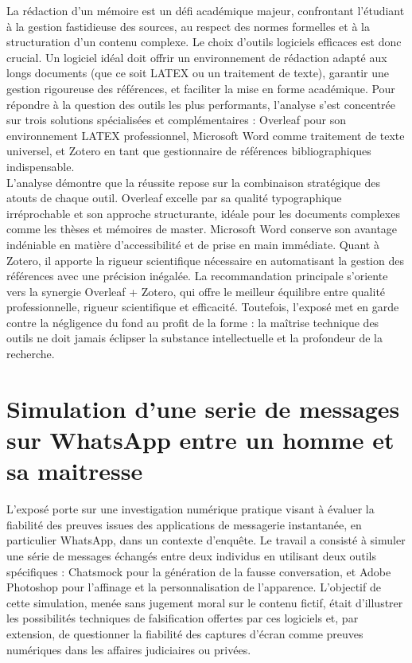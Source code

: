 \documentclass[12pt, openany]{report}
\begin{document}
La rédaction d'un mémoire est un défi académique majeur, confrontant l'étudiant à la gestion fastidieuse des sources, au respect des normes formelles et à la structuration d'un contenu complexe. Le choix d'outils logiciels efficaces est donc crucial. Un logiciel idéal doit offrir un environnement de rédaction adapté aux longs documents (que ce soit LATEX ou un traitement de texte), garantir une gestion rigoureuse des références, et faciliter la mise en forme académique. Pour répondre à la question des outils les plus performants, l'analyse s'est concentrée sur trois solutions spécialisées et complémentaires : Overleaf pour son environnement LATEX professionnel, Microsoft Word comme traitement de texte universel, et Zotero en tant que gestionnaire de références bibliographiques indispensable.\\
L'analyse démontre que la réussite repose sur la combinaison stratégique des atouts de chaque outil. Overleaf excelle par sa qualité typographique irréprochable et son approche structurante, idéale pour les documents complexes comme les thèses et mémoires de master. Microsoft Word conserve son avantage indéniable en matière d'accessibilité et de prise en main immédiate. Quant à Zotero, il apporte la rigueur scientifique nécessaire en automatisant la gestion des références avec une précision inégalée. La recommandation principale s'oriente vers la synergie Overleaf + Zotero, qui offre le meilleur équilibre entre qualité professionnelle, rigueur scientifique et efficacité. Toutefois, l'exposé met en garde contre la négligence du fond au profit de la forme : la maîtrise technique des outils ne doit jamais éclipser la substance intellectuelle et la profondeur de la recherche.\\
\newpage
\section{Simulation d'une serie de messages sur
WhatsApp entre un homme et sa maitresse}

L'exposé porte sur une investigation numérique pratique visant à évaluer la fiabilité des preuves issues des applications de messagerie instantanée, en particulier WhatsApp, dans un contexte d'enquête. Le travail a consisté à simuler une série de messages échangés entre deux individus en utilisant deux outils spécifiques : Chatsmock pour la génération de la fausse conversation, et Adobe Photoshop pour l'affinage et la personnalisation de l'apparence. L'objectif de cette simulation, menée sans jugement moral sur le contenu fictif, était d'illustrer les possibilités techniques de falsification offertes par ces logiciels et, par extension, de questionner la fiabilité des captures d'écran comme preuves numériques dans les affaires judiciaires ou privées.\\
\end{document}
